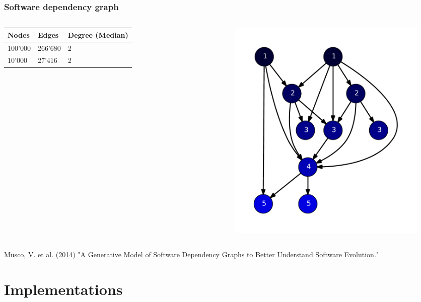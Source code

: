 \begin{frame}
\frametitle{Software dependency graph}

\begin{columns}[c]
 \begin{tabular}{p{1cm}p{1cm}p{1.5cm}}
  Nodes    & Edges   & Degree (Median)\\\hline
  100'000  & 266'680 & 2\\
  10'000   & 27'416  & 2
 \end{tabular}
 \begin{figure}[!hbp]
    \includegraphics[height=0.7\textheight]{img/software10.pdf}
 \end{figure}
\end{columns}
{\color{gray}\tiny Musco, V. et al. (2014) "A Generative Model of Software Dependency Graphs to Better Understand Software Evolution."}

\end{frame}


\section{Implementations}

